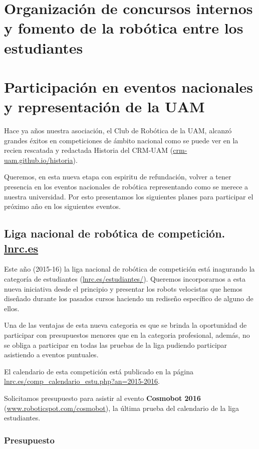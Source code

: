 \documentclass[12pt,twoside]{report}
\begin{document}
\section{Organización de concursos internos y fomento de la robótica entre los estudiantes}


\section{Participación en eventos nacionales y representación de la UAM}

Hace ya años nuestra asociación, el Club de Robótica de la UAM, alcanzó grandes éxitos en competiciones de ámbito nacional como se puede ver en la recien rescatada y redactada Historia del CRM-UAM (\url{crm-uam.github.io/historia}).

Queremos, en esta nueva etapa con espiritu de refundación, volver a tener presencia en los eventos nacionales de robótica representando como se merece a nuestra universidad. Por esto presentamos los siguientes planes para participar el próximo año en los siguientes eventos.

\subsection{Liga nacional de robótica de competición. \url{lnrc.es}}
Este año (2015-16) la liga nacional de robótica de competición está inagurando la categoría de estudiantes (\url{lnrc.es/estudiantes/}). Queremos incorporarnos a esta nueva iniciativa desde el principio y presentar los robots velocistas que hemos diseñado durante los pasados cursos haciendo un rediseño específico de alguno de ellos.

Una de las ventajas de esta nueva categoria es que se brinda la oportunidad de participar con presupuestos menores que en la categoria profesional, además, no se obliga a participar en todas las pruebas de la liga pudiendo participar asistiendo a eventos puntuales.

El calendario de esta competición está publicado en la página \url{lnrc.es/comp_calendario_estu.php?an=2015-2016}.

Solicitamos presupuesto para asistir al evento {\bf Cosmobot 2016} (\url{www.roboticspot.com/cosmobot}), la última prueba del calendario de la liga estudiantes.

\subsubsection{Presupuesto}
\end{document}
